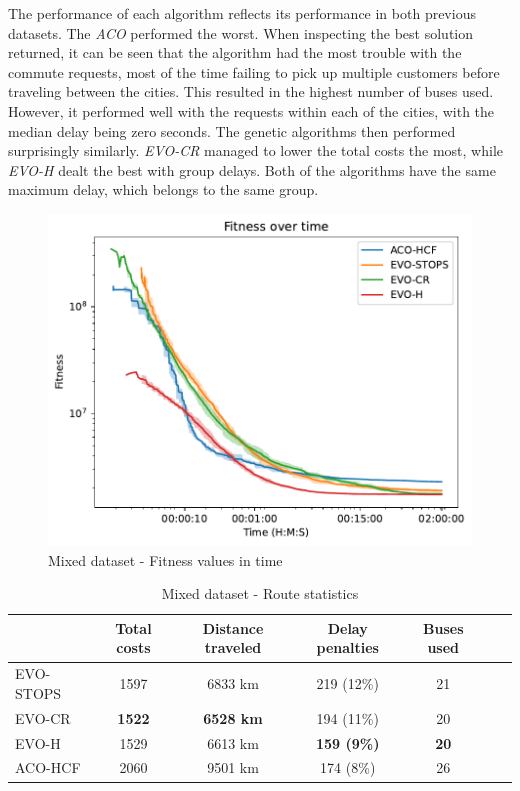 The performance of each algorithm reflects its performance in both previous datasets. The \textit{ACO} performed the worst. When inspecting the best solution returned, it can be seen that the algorithm had the most trouble with the commute requests, most of the time failing to pick up multiple customers before traveling between the cities. This resulted in the highest number of buses used. However, it performed well with the requests within each of the cities, with the median delay being zero seconds. The genetic algorithms then performed surprisingly similarly. \textit{EVO-CR}
managed to lower the total costs the most, while \textit{EVO-H} dealt the best with group delays. Both of the algorithms have the same maximum delay, which belongs to the same group.

\clearpage

\begin{figure}
    \centering
    \includegraphics[width=1\linewidth]
    {img/exp_mixed_100_time.pdf}
    \caption{Mixed dataset - Fitness values in time}
    \label{fig:exp_mixed}
\end{figure}

\begin{table}
    \centering
    \begin{tabular}{lcccccc}
         & Total costs & Distance traveled & Delay penalties & Buses used \\
         \hline
         EVO-STOPS & 1597 & 6833 km & 219 (12\%) & 21 \\
         EVO-CR & \textbf{1522} & \textbf{6528 km} & 194 (11\%) & 20 \\
         EVO-H & 1529 & 6613 km & \textbf{159 (9\%)} & \textbf{20} \\
         ACO-HCF & 2060 & 9501 km & 174 (8\%) & 26 \\
    \end{tabular}
    \caption{Mixed dataset - Route statistics}
    \label{tab:exp_mixed_route_stats}
\end{table}


